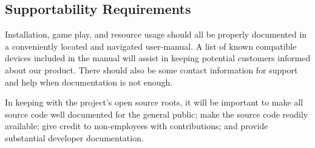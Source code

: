 \documentclass[12pt]{article}
\begin{document}
\subsection{Supportability Requirements}
Installation, game play, and resource usage should all be properly documented in a conveniently located and navigated user-manual. A list of known compatible devices included in the manual will assist in keeping potential customers informed about our product.  There should also be some contact information for support and help when documentation is not enough.

In keeping with the project's open source roots, it will be important to make all source code well documented for the general public; make the source code readily available; give credit to non-employees with contributions; and provide substantial developer documentation. 
\end{document}
